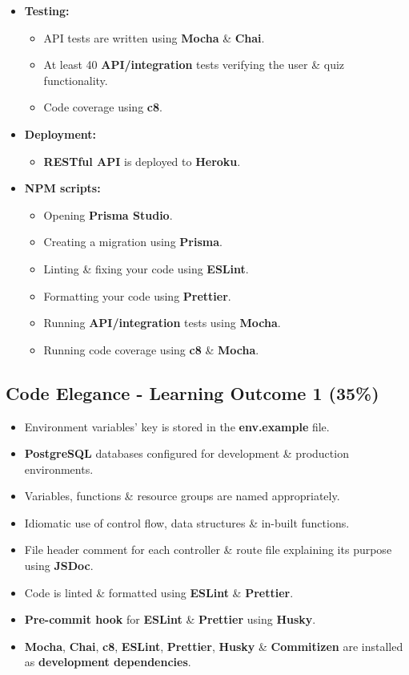 \documentclass{article}
\begin{document}
\begin{itemize}
\begin{itemize}
	\end{itemize}
	\item \textbf{Testing:}
	\begin{itemize}
		\item API tests are written using \textbf{Mocha} \& \textbf{Chai}.
		\item At least 40 \textbf{API/integration} tests verifying the user \& quiz functionality.
		\item Code coverage using \textbf{c8}. 
	\end{itemize}
	\item \textbf{Deployment:}
	\begin{itemize}
		\item \textbf{RESTful API} is deployed to \textbf{Heroku}. 
	\end{itemize}
	\item \textbf{NPM scripts:}
	\begin{itemize}
		\item Opening \textbf{Prisma Studio}.
		\item Creating a migration using \textbf{Prisma}. 
		\item Linting \& fixing your code using \textbf{ESLint}.
		\item Formatting your code using \textbf{Prettier}.
		\item Running \textbf{API/integration} tests using \textbf{Mocha}.
		\item Running code coverage using \textbf{c8} \& \textbf{Mocha}.
	\end{itemize}
\end{itemize}

\subsection*{Code Elegance - Learning Outcome 1 (35\%)}
\begin{itemize}
	\item Environment variables' key is stored in the \textbf{env.example} file. 
	\item \textbf{PostgreSQL} databases configured for development \& production environments.
	\item Variables, functions \& resource groups are named appropriately.
	\item Idiomatic use of control flow, data structures \& in-built functions.
	\item File header comment for each controller \& route file explaining its purpose using \textbf{JSDoc}.
	\item Code is linted \& formatted using \textbf{ESLint} \& \textbf{Prettier}.
	\item \textbf{Pre-commit hook} for \textbf{ESLint} \& \textbf{Prettier} using \textbf{Husky}.
	\item \textbf{Mocha}, \textbf{Chai}, \textbf{c8}, \textbf{ESLint}, \textbf{Prettier}, \textbf{Husky} \& \textbf{Commitizen} are installed as \textbf{development dependencies}.	
\end{itemize}
\end{document}

